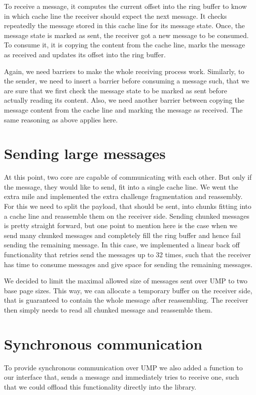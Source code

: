 To receive a message, it computes the current offset into the ring buffer to
know in which cache line the receiver should expect the next message. It  checks
repeatedly the message stored in this cache line for its message state. Once,
the message state is marked as sent, the receiver got a new message to be
consumed. To consume it, it is copying the content from the cache line, marks
the message as received and updates its offset into the ring buffer.

Again, we need barriers to make the whole receiving process work. Similarly, to
the sender, we need to insert a barrier before consuming a message such, that we
are sure that we first check the message state to be marked as sent before
actually reading its content. Also, we need another barrier between copying the
message content from the cache line and marking the message as received. The
same reasoning as above applies here.

\section{Sending large messages}

At this point, two core are capable of communicating with each other. But only
if the message, they would like to send, fit into a single cache line. We went
the extra mile and implemented the extra challenge fragmentation and reassembly.
For this we need to split the payload, that should be sent, into chunks fitting
into a cache line and reassemble them on the receiver side. Sending chunked
messages is pretty straight forward, but one point to mention here is the case
when we send many chunked messages and completely fill the ring buffer and hence
fail sending the remaining message. In this case, we implemented a linear back
off functionality that retries send the messages up to 32 times, such that the
receiver has time to consume messages and give space for sending the remaining
messages.

We decided to limit the maximal allowed size of messages sent over UMP to two
base page sizes. This way, we can allocate a temporary buffer on the receiver
side, that is guaranteed to contain the whole message after reassembling. The
receiver then simply needs to read all chunked message and reassemble them.

\section{Synchronous communication}

To provide synchronous communication over UMP we also added a function to our
interface that, sends a message and immediately tries to receive one, such that
we could offload this functionality directly into the library.

